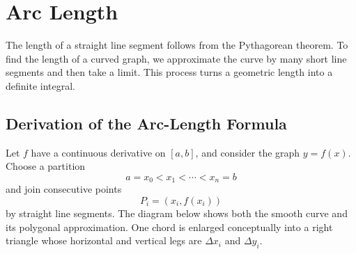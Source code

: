 \section{Arc Length}

The length of a straight line segment follows from the Pythagorean theorem.
To find the length of a curved graph, we approximate the curve by many short
line segments and then take a limit.  This process turns a geometric length
into a definite integral.

\subsection{Derivation of the Arc-Length Formula}

Let \(f\) have a continuous derivative on \([a,b]\), and consider the graph
\(y=f(x)\).  Choose a partition
\[
    a=x_0<x_1<\cdots<x_n=b
\]
and join consecutive points
\[
    P_i=(x_i,f(x_i))
\]
by straight line segments.  The diagram below shows both the smooth curve
and its polygonal approximation.  One chord is enlarged conceptually into a
right triangle whose horizontal and vertical legs are \(\Delta x_i\) and
\(\Delta y_i\).


